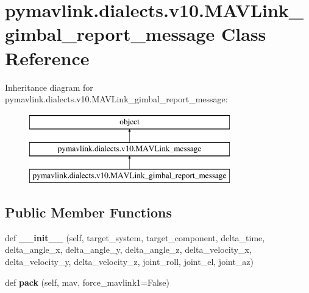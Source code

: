 \hypertarget{classpymavlink_1_1dialects_1_1v10_1_1MAVLink__gimbal__report__message}{}\section{pymavlink.\+dialects.\+v10.\+M\+A\+V\+Link\+\_\+gimbal\+\_\+report\+\_\+message Class Reference}
\label{classpymavlink_1_1dialects_1_1v10_1_1MAVLink__gimbal__report__message}
Inheritance diagram for pymavlink.\+dialects.\+v10.\+M\+A\+V\+Link\+\_\+gimbal\+\_\+report\+\_\+message\+:\begin{figure}[H]
\begin{center}
\leavevmode
\includegraphics[height=3.000000cm]{classpymavlink_1_1dialects_1_1v10_1_1MAVLink__gimbal__report__message}
\end{center}
\end{figure}
\subsection*{Public Member Functions}
\begin{DoxyCompactItemize}
\item 
\mbox{\label{classpymavlink_1_1dialects_1_1v10_1_1MAVLink__gimbal__report__message_ac7a0b82ce0cf61a5593ac1dab4c13047}} 
def {\bfseries \+\_\+\+\_\+init\+\_\+\+\_\+} (self, target\+\_\+system, target\+\_\+component, delta\+\_\+time, delta\+\_\+angle\+\_\+x, delta\+\_\+angle\+\_\+y, delta\+\_\+angle\+\_\+z, delta\+\_\+velocity\+\_\+x, delta\+\_\+velocity\+\_\+y, delta\+\_\+velocity\+\_\+z, joint\+\_\+roll, joint\+\_\+el, joint\+\_\+az)
\item 
\mbox{\label{classpymavlink_1_1dialects_1_1v10_1_1MAVLink__gimbal__report__message_a8d1f8677c96e9ed12ccae94009bd76e9}} 
def {\bfseries pack} (self, mav, force\+\_\+mavlink1=False)
\end{DoxyCompactItemize}
